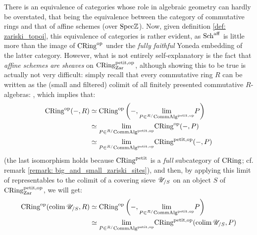                 \begin{remark} \label{remark: affine_schemes_are_zariski_sheaves}
                    There is an equivalence of categories whose role in algebraic geometry can hardly be overstated, that being the equivalence between the category of commutative rings and that of affine schemes (over $\Spec \Z$). Now, given definition \ref{def: zariski_topoi}, this equivalence of categories is rather evident, as $\Sch^{\aff}$ is little more than the image of $\Cring^{\op}$ under the \textit{fully faithful} Yoneda embedding of the latter category. However, what is not entirely self-explanatory is the fact that \textit{affine schemes are sheaves} on $\Cring^{\petit, \op}_{\Zar}$, although showing this to be true is actually not very difficult: simply recall that every commutative ring $R$ can be written as the (small and filtered) colimit of all finitely presented commutative $R$-algebras:
                    \cite[\href{https://stacks.math.columbia.edu/tag/0BUF}{Tag 0BUF}]{stacks}, which implies that:
                        $$
                            \begin{aligned}
                                \Cring^{\op}(-, R) & \cong \Cring^{\op}\left(-, \underset{P \in {}^{R/}\Comm\Alg^{\petit, \op}}{\lim} P\right)
                                \\
                                & \cong \underset{P \in {}^{R/}\Comm\Alg^{\petit, \op}}{\lim} \Cring^{\op}(-, P)
                                \\
                                & \cong \underset{P \in {}^{R/}\Comm\Alg^{\petit, \op}}{\lim} \Cring^{\petit, \op}(-, P)
                            \end{aligned}
                        $$
                    (the last isomorphism holds because $\Cring^{\petit}$ is a \textit{full} subcategory of $\Cring$; cf. remark \ref{remark: big_and_small_zariski_sites}), and then, by applying this limit of representables to the colimit of a covering sieve $\U_{/S}$ on an object $S$ of $\Cring^{\petit, \op}_{\Zar}$, we will get:
                        $$
                            \begin{aligned}
                                \Cring^{\op}(\colim \U_{/S}, R) & \cong \Cring^{\op}\left(-, \underset{P \in {}^{R/}\Comm\Alg^{\petit, \op}}{\lim} P\right)
                                \\
                                & \cong \underset{P \in {}^{R/}\Comm\Alg^{\petit, \op}}{\lim} \Cring^{\petit, \op}(\colim \U_{/S}, P)

\end{aligned}$$
\end{remark}
